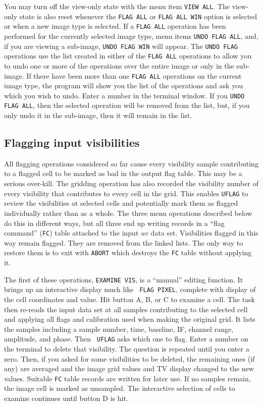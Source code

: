 \documentclass[twoside]{article}
\begin{document}
You may turn off the view-only state with the menu item {\tt VIEW
  ALL}\@.  The view-only state is also reset whenever the {\tt FLAG
  ALL} or {\tt FLAG ALL WIN} option is selected or when a new image
type is selected.  If a {\tt FLAG ALL} operation has been performed
for the currently selected image type, menu items {\tt UNDO FLAG ALL},
and, if you are viewing a sub-image, {\tt UNDO FLAG WIN} will appear.
The {\tt UNDO FLAG} operations use the list created in either of the
{\tt FLAG ALL} operations to allow you to undo one or more of the
operations over the entire image or only in the sub-image.  If there
have been more than one {\tt FLAG ALL} operations on the current image
type, the program will show you the list of the operations and ask you
which you wish to undo.  Enter a number in the terminal window.  If
you {\tt UNDO FLAG ALL}, then the selected operation will be removed
from the list, but, if you only undo it in the sub-image, then it will
remain in the list.

\subsection{Flagging input visibilities}

All flagging operations considered so far cause every visibility
sample contributing to a flagged cell to be marked as bad in the
output flag table.  This may be a serious over-kill.  The gridding
operation has also recorded the visibility number of every visibility
that contributes to every cell in the grid.  This enables {\tt UFLAG}
to review the visibilities at selected cells and potentially mark them
as flagged individually rather than as a whole.  The three menu
operations described below do this in different ways, but all three
end up writing records in a ``flag command'' ({\tt FC}) table attached
to the input $uv$ data set.  Visibilities flagged in this way remain
flagged.  They are removed from the linked lists.  The only way to
restore them is to exit with {\tt ABORT} which destroys the {\tt FC}
table without applying it.
\vfill\eject

The first of these operations, {\tt EXAMINE VIS}, is a ``manual''
editing function.  It brings up an interactive display much like {\tt
  FLAG PIXEL}, complete with display of the cell coordinates and
value.  Hit button A, B, or C to examine a cell.  The task then
re-reads the input data set at all samples contributing to the
selected cell and applying all flags and calibration used when making
the original grid.  It lists the samples including a sample number,
time, baseline, IF, channel range, amplitude, and phase.  Then {\tt
  UFLAG} asks which one to flag.  Enter a number on the terminal to
delete that visibility.  The question is repeated until you enter a
zero.  Then, if you asked for some visibilities to be deleted, the
remaining ones (if any) are averaged and the image grid values and TV
display changed to the new values.  Suitable {\tt FC} table records
are written for later use.  If no samples remain, the image cell is
marked as unsampled.  The interactive selection of cells to examine
continues until button D is hit.
\end{document}
